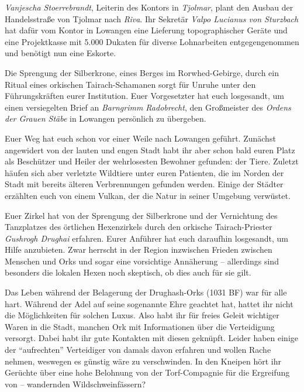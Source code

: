 \emph{Vanjescha Stoerrebrandt}, Leiterin des Kontors in \emph{Tjolmar}, plant den Ausbau der Handelsstraße von Tjolmar nach \emph{Riva}.
Ihr Sekretär \emph{Valpo Lucianus von Sturzbach} hat dafür vom Kontor in Lowangen eine Lieferung topographischer Geräte und eine Projektkasse mit 5.000 Dukaten für diverse Lohnarbeiten entgegengenommen und benötigt nun eine Eskorte.

Die Sprengung der Silberkrone, eines Berges im Rorwhed-Gebirge, durch ein Ritual eines orkischen Tairach-Schamanen sorgt für Unruhe unter den Führungskräften eurer Institution.
Euer Vorgesetzter hat euch losgesandt, um einen versiegelten Brief an \emph{Barngrimm Radobrecht}, den Großmeister des \emph{Ordens der Grauen Stäbe} in Lowangen persönlich zu übergeben.

Euer Weg hat euch schon vor einer Weile nach Lowangen geführt.
Zunächst angewidert von der lauten und engen Stadt habt ihr aber schon bald euren Platz als Beschützer und Heiler der wehrlosesten Bewohner gefunden: der Tiere.
Zuletzt häufen sich aber verletzte Wildtiere unter euren Patienten, die im Norden der Stadt mit bereits älteren Verbrennungen gefunden werden.
Einige der Städter erzählten euch von einem Vulkan, der die Natur in seiner Umgebung verwüstet.


Euer Zirkel hat von der Sprengung der Silberkrone und der Vernichtung des Tanzplatzes des örtlichen Hexenzirkels durch den orkische Tairach-Priester \emph{Gushrogh Drughai} erfahren.
Eurer Anführer hat euch daraufhin losgesandt, um Hilfe anzubieten.
Zwar herrscht in der Region inzwischen Frieden zwischen Menschen und Orks und sogar eine vorsichtige Annäherung --
allerdings sind besonders die lokalen Hexen noch skeptisch, ob dies auch für sie gilt.

Das Leben während der Belagerung der Drughash-Orks (1031 BF) war für alle hart.
Während der Adel auf seine sogenannte Ehre geachtet hat, hattet ihr nicht die Möglichkeiten für solchen Luxus.
Also habt ihr für freies Geleit wichtiger Waren in die Stadt, manchen Ork mit Informationen über die Verteidigung versorgt.
Dabei habt ihr gute Kontakten mit diesen geknüpft.
Leider haben einige der \enquote{aufrechten} Verteidiger von damals davon erfahren und wollen Rache nehmen, weswegen es günstig wäre zu verschwinden.
In den Kneipen hört ihr Gerüchte über eine hohe Belohnung von der Torf-Compagnie für die Ergreifung von -- wandernden Wildschweinfässern?

